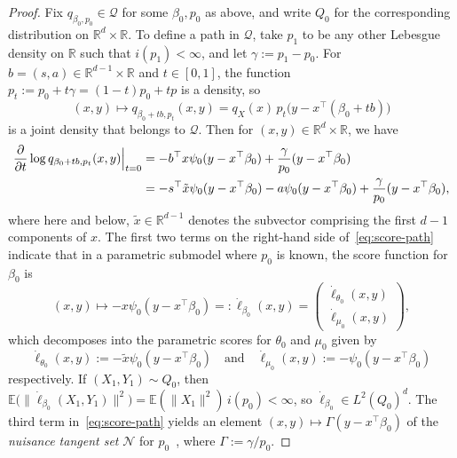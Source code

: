 \documentclass[a4paper]{article}
\newcommand{\R}{\mathbb{R}}
\newcommand{\E}{\mathbb{E}}
\newcommand{\norm}[1]{\|{#1}\|}
\theoremstyle{definition}
\begin{document}
\begin{proof}
Fix $q_{\beta_0,p_0} \in \mathcal{Q}$ for some $\beta_0,p_0$ as above, and write $Q_0$ for the corresponding distribution on $\R^d \times \R$. To define a path in $\mathcal{Q}$, take $p_1$ to be any other Lebesgue density on $\R$ such that $i(p_1) < \infty$, and let $\gamma := p_1 - p_0$. For $b = (s,a) \in \R^{d-1} \times \R$ and $t \in [0,1]$, the function $p_t := p_0 + t\gamma = (1 - t)p_0 + tp$ is a density, so
\[
(x,y) \mapsto q_{\beta_0 + tb, p_t}(x,y) = q_X(x)\,p_t\bigl(y - x^\top(\beta_0 + tb)\bigr) 
\]
is a joint density that belongs to $\mathcal{Q}$. Then
for $(x,y) \in \R^d \times \R$, we have
\begin{align}
\frac{\partial}{\partial t}\log q_{\beta_0 + tb, p_t}(x,y)\Big|_{t=0} &= -b^\top x\psi_0(y - x^\top\beta_0) + \frac{\gamma}{p_0}(y - x^\top\beta_0) \notag \\
\label{eq:score-path}
&= -s^\top\tilde{x} \psi_0(y - x^\top\beta_0) - a\psi_0(y - x^\top\beta_0) + \frac{\gamma}{p_0}(y - x^\top\beta_0),
\end{align}
where here and below, $\tilde{x} \in \R^{d-1}$ denotes the subvector comprising the first $d - 1$ components of $x$. The first two terms on the right-hand side of~\eqref{eq:score-path} indicate that in a parametric submodel where $p_0$ is known, the score function for $\beta_0$ is
\[
(x,y) \mapsto -x\psi_0(y - x^\top\beta_0) =: \dot{\ell}_{\beta_0}(x,y) =
\begin{pmatrix}
\dot{\ell}_{\theta_0}(x,y) \\
\dot{\ell}_{\mu_0}(x,y)
\end{pmatrix},
\]
which decomposes into the parametric scores for $\theta_0$ and $\mu_0$ given by
\[
\dot{\ell}_{\theta_0}(x,y) := -\tilde{x}\psi_0(y - x^\top\beta_0) \quad\text{and}\quad \dot{\ell}_{\mu_0}(x,y) := -\psi_0(y - x^\top\beta_0)
\]
respectively. If $(X_1,Y_1) \sim Q_0$, then $\E\bigl(\norm{\dot{\ell}_{\beta_0}(X_1,Y_1)}^2\bigr) = \E(\norm{X_1}^2)\,i(p_0) < \infty$, so $\dot{\ell}_{\beta_0} \in L^2(Q_0)^d$. The third term in~\eqref{eq:score-path} yields an element $(x,y) \mapsto \Gamma(y - x^\top\beta_0)$ of the \textit{nuisance tangent set} $\mathcal{N}$ for $p_0$~\citep[Section~25.4]{vdV1998asymptotic},
where $\Gamma := \gamma/p_0$. 


\end{proof}
\end{document}
